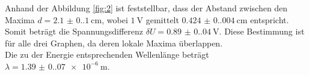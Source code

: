 Anhand der Abbildung \ref{fig:2} ist feststellbar, dass der Abstand zwischen den Maxima $d=\qty{2.1(0.1)}{\centi\meter}$, 
wobei $\qty{1}{\volt}$ gemittelt $\qty{0.424(0.004)}{\centi\meter}$ entspricht. Somit beträgt die Spannungsdifferenz 
$\delta U=\qty{0.89(0.04)}{\volt}$. Diese Bestimmung ist für alle drei Graphen, da deren lokale Maxima überlappen.\\

Die zu der Energie entsprechenden Wellenlänge beträgt $\lambda=\qty{1.39(0.07)e-6}{\meter}$.

